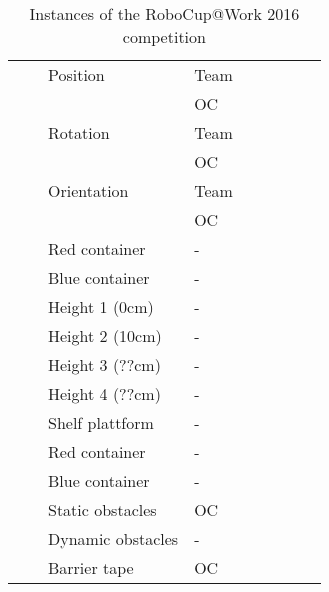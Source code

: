 \begin{table}[h!]
\begin{tabular}{l|l|l|l*{5}{|P{1cm}}|}
      &  & Position              & Team     &   \Y       &           &          &           &         \\
      &  &                       & OC       &            &           &          &           &         \\
	  &  & Rotation              & Team     &   \Y       &           &          &           &         \\
      &  &                       & OC       &            &           &          &           &         \\
	  &  & Orientation           & Team     &   \Y       &           &          &           &         \\
      &  &                       & OC       &            &           &          &           &         \\
      &  & Red container         & -        &            &           &          &           &         \\
      &  & Blue container        & -        &            &           &          &           &         \\
      \hhline{~--------}
      & 
          & Height 1 (0cm)       & -        &            &           &          &           &         \\
      &  & Height 2 (10cm)       & -        &    \Y      &           &          &           &         \\
      &  & Height 3 (??cm)       & -        &            &           &          &           &         \\
      &  & Height 4 (??cm)       & -        &            &           &          &           &         \\
      &  & Shelf plattform       & -        &            &           &          &           &         \\
      &  & Red container         & -        &            &           &          &           &         \\
      &  & Blue container        & -        &            &           &          &           &         \\
    \hline
     & 
     &      Static obstacles     & OC      &            &           &          &           &         \\
     &   &  Dynamic obstacles    & -       &            &           &          &           &         \\
     &   &  Barrier tape         & OC      &            &           &          &           &         \\
     \hline
 \end{tabular}
 \label{tab:Instances}
 \caption{Instances of the RoboCup@Work 2016 competition}
\end{table}
